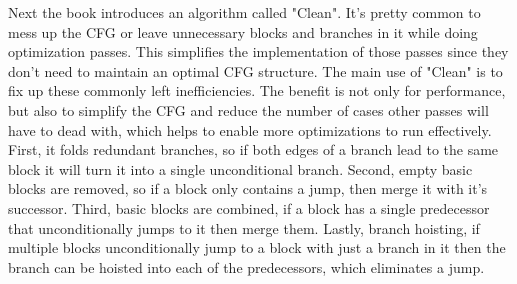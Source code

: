 \documentclass[11pt, a4paper, titlepage]{article}
\begin{document}
Next the book introduces an algorithm called "Clean". It's pretty common to mess up the CFG or leave unnecessary blocks and branches in it while doing optimization passes. This simplifies the implementation of those passes since they don't need to maintain an optimal CFG structure. The main use of "Clean" is to fix up these commonly left inefficiencies. The benefit is not only for performance, but also to simplify the CFG and reduce the number of cases other passes will have to dead with, which helps to enable more optimizations to run effectively. First, it folds redundant branches, so if both edges of a branch lead to the same block it will turn it into a single unconditional branch. Second, empty basic blocks are removed, so if a block only contains a jump, then merge it with it's successor. Third, basic blocks are combined, if a block has a single predecessor that unconditionally jumps to it then merge them. Lastly, branch hoisting, if multiple blocks unconditionally jump to a block with just a branch in it then the branch can be hoisted into each of the predecessors, which eliminates a jump.
\end{document}
